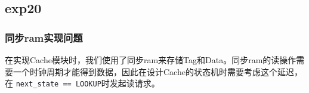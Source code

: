 \subsection{exp20}

\subsubsection{同步ram实现问题}

在实现Cache模块时，我们使用了同步ram来存储Tag和Data。同步ram的读操作需要一个时钟周期才能得到数据，因此在设计Cache的状态机时需要考虑这个延迟，在 \verb|next_state == LOOKUP|时发起读请求。
